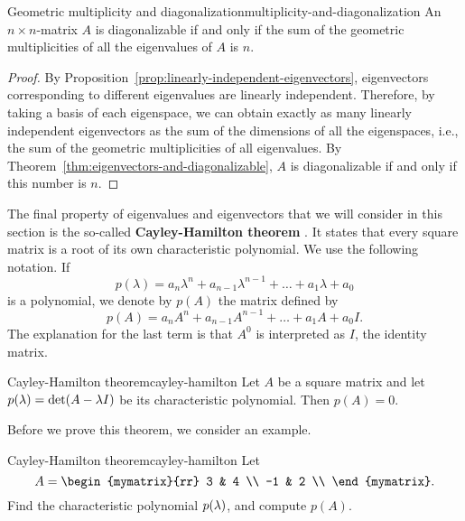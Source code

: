 \begin{proposition}{Geometric multiplicity and diagonalization}{multiplicity-and-diagonalization}
  An $n\times n$-matrix $A$ is diagonalizable if and only if the sum
  of the geometric multiplicities of all the eigenvalues of $A$ is
  $n$.
\end{proposition}

\begin{proof}
  By Proposition~\ref{prop:linearly-independent-eigenvectors},
  eigenvectors corresponding to different eigenvalues are linearly
  independent. Therefore, by taking a basis of each eigenspace, we can
  obtain exactly as many linearly independent eigenvectors as the sum
  of the dimensions of all the eigenspaces, i.e., the sum of the
  geometric multiplicities of all eigenvalues. By
  Theorem~\ref{thm:eigenvectors-and-diagonalizable}, $A$ is
  diagonalizable if and only if this number is $n$.
\end{proof}

The final property of eigenvalues and eigenvectors that we will
consider in this section is the so-called \textbf{Cayley-Hamilton
  theorem}%
%
%
. It states that every square
matrix is a root of its own characteristic polynomial. We use the
following notation. If
\begin{equation*}
  p(\lambda) = a_n\lambda^n + a_{n-1}\lambda^{n-1} + \ldots +
  a_1\lambda + a_0
\end{equation*}
is a polynomial, we denote by $p(A)$ the matrix defined by
\begin{equation*}
  p(A) = a_nA^n + a_{n-1}A^{n-1} + \ldots + a_1A + a_0I.
\end{equation*}
The explanation for the last term is that $A^0$ is interpreted as $I$,
the identity matrix.

\begin{theorem}{Cayley-Hamilton theorem}{cayley-hamilton}
  Let $A$ be a square matrix and let $p(\lambda)=\det(A-\lambda
  I)$ be its characteristic polynomial. Then $p(A)=0$.
\end{theorem}

Before we prove this theorem, we consider an example.

\begin{example}{Cayley-Hamilton theorem}{cayley-hamilton}
  Let
  \begin{equation*}
    A = \begin{mymatrix}{rr}
      3 & 4 \\
      -1 & 2 \\
    \end{mymatrix}.
  \end{equation*}
  Find the characteristic polynomial $p(\lambda)$, and compute
  $p(A)$.
\end{example}

